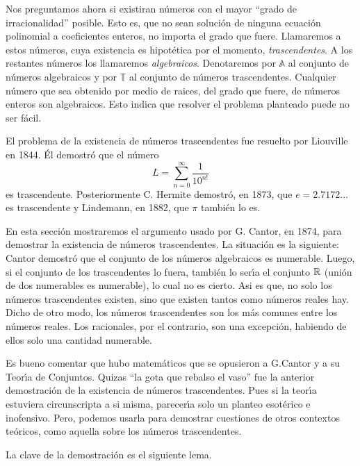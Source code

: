 Nos preguntamos ahora si existiran n\'umeros con el mayor ``grado
de irracionalidad''  posible. Esto es, que no sean soluci\'on de
ninguna ecuaci\'on polinomial a coeficientes enteros, no importa
el grado que fuere. Llamaremos a estos n\'umeros, cuya existencia
es hipot\'etica por el momento, \emph{trascendentes}. A los
restantes n\'umeros los llamaremos \emph{algebraicos}. Denotaremos
por $\mathbb{A}$ al conjunto de n\'umeros algebraicos y por
$\mathbb{T}$ al conjunto de n\'umeros trascendentes. Cualquier
n\'umero que sea obtenido por medio de raices, del grado que
fuere, de n\'umeros enteros son algebraicos. Esto indica que
resolver el problema planteado puede no ser f\'acil.

El problema de la existencia de n\'umeros trascendentes fue
resuelto por Liouville en 1844. \'El demostr\'o que el n\'umero
\[L=\sum_{n=0}^{\infty}\frac{1}{10^{n!}}\]
es trascendente. Posteriormente C. Hermite demostr\'o, en 1873,
que $e=2.7172...$ es trascendente y Lindemann, en 1882, que $\pi$
tambi\'en lo es.

En esta secci\'on mostraremos el argumento usado por G. Cantor, en
1874, para demostrar la existencia de n\'umeros trascendentes. La
situaci\'on es la siguiente: Cantor demostr\'o que el conjunto de
los n\'umeros algebraicos es numerable. Luego, si el conjunto de
los trascendentes lo fuera, tambi\'en lo ser\'{\i}a el conjunto
$\rr$ (uni\'on de dos numerables es numerable), lo cual no es
cierto. Asi es que, no solo los n\'umeros trascendentes existen,
sino que existen tantos como n\'umeros reales hay. Dicho de otro
modo, los n\'umeros trascendentes son los m\'as comunes entre los
n\'umeros reales. Los racionales, por el contrario, son una
excepci\'on, habiendo de ellos solo una cantidad numerable.

Es bueno comentar que hubo matem\'aticos  que se opusieron a
G.Cantor y a su Teor\'{\i}a de Conjuntos. Quizas ``la gota que
rebalso el vaso'' fue la anterior demostraci\'on de la existencia
de n\'umeros trascendentes. Pues si la teor\'{\i}a estuviera
circunscripta a si misma, parecer\'{\i}a solo un planteo
esot\'erico e inofensivo. Pero, podemos usarla para demostrar
cuestiones de otros contextos te\'oricos, como aquella sobre los
n\'umeros trascendentes.

La clave de la demostraci\'on es el siguiente lema.

